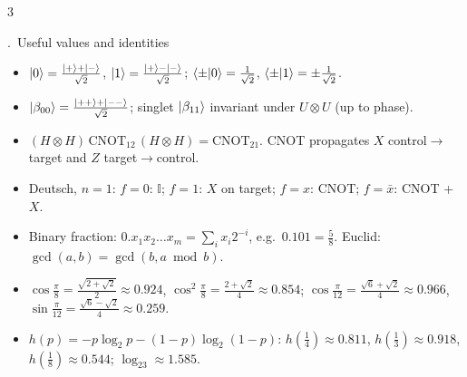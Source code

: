 \documentclass[8pt,a4paper]{extarticle}
\newcounter{sec}\newcounter{ssec}[sec]
\newcommand{\sect}[1]{\stepcounter{sec}\par\vspace{2pt}\noindent\colorbox{hd}{\parbox{\dimexpr\linewidth-2\fboxsep}{\color{white}\bfseries\strut\arabic{sec}.\ #1}}\par\vspace{0.5pt}}
\newcommand{\id}{\mathbb{I}}
\begin{document}
\begin{multicols}{3}
\sect{Useful values and identities}
\begin{itemize}
\item $\ket0=\frac{\ket++\ket-}{\sqrt2}$, $\ket1=\frac{\ket+-\ket-}{\sqrt2}$; $\braket{\pm|0}=\frac1{\sqrt2}$, $\braket{\pm|1}=\pm\frac1{\sqrt2}$.
\item $\ket{\beta_{00}}=\frac{\ket{++}+\ket{--}}{\sqrt2}$; singlet $\ket{\beta_{11}}$ invariant under $U\otimes U$ (up to phase).
\item $(H\otimes H)\,\text{CNOT}_{12}\,(H\otimes H)=\text{CNOT}_{21}$. CNOT propagates $X$ control$\to$target and $Z$ target$\to$control.
\item Deutsch, $n=1$: $f=0$: $\id$; $f=1$: $X$ on target; $f=x$: CNOT; $f=\bar x$: CNOT + $X$.
\item Binary fraction: $0.x_1x_2\dots x_m=\sum_ix_i2^{-i}$, e.g.\ $0.101=\frac58$. Euclid: $\gcd(a,b)=\gcd(b,a\bmod b)$.
\item $\cos\frac\pi8=\frac{\sqrt{2+\sqrt2}}2\approx0.924$, $\cos^2\frac\pi8=\frac{2+\sqrt2}4\approx0.854$; $\cos\frac\pi{12}=\frac{\sqrt6+\sqrt2}4\approx0.966$, $\sin\frac\pi{12}=\frac{\sqrt6-\sqrt2}4\approx0.259$.
\item $h(p)=-p\log_2p-(1{-}p)\log_2(1{-}p)$: $h(\frac14)\approx0.811$, $h(\frac13)\approx0.918$, $h(\frac18)\approx0.544$; $\log_23\approx1.585$.\end{itemize}

\end{multicols}
\end{document}
